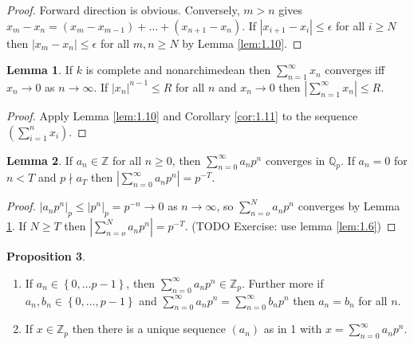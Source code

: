 \documentclass{article}
\newcommand{\Z}{\mathbb{Z}}
\newcommand{\Q}{\mathbb{Q}}
\newcommand{\rb}[1]{\left( #1 \right)}
\newcommand{\cb}[1]{\left\{ #1 \right\}}
\newcommand{\abs}[1]{\left\lvert #1 \right\rvert}
\theoremstyle{definition}\newtheorem{definition}{Definition}[section]
\theoremstyle{definition}\newtheorem{remark}[definition]{Remark}
\theoremstyle{definition}\newtheorem*{example}{Example}
\theoremstyle{definition}\newtheorem*{note}{Note}
\newtheorem{proposition}[definition]{Proposition}
\newtheorem{lemma}[definition]{Lemma}
\begin{document}
\begin{proof}
Forward direction is obvious. Conversely, $ m > n $ gives $ x_m - x_n = \rb{x_m - x_{m - 1}} + \dots + \rb{x_{n + 1} - x_n} $. If $ \abs{x_{i + 1} - x_i} \le \epsilon $ for all $ i \ge N $ then $ \abs{x_m - x_n} \le \epsilon $ for all $ m, n \ge N $ by Lemma \ref{lem:1.10}.
\end{proof}

\begin{lemma}
\label{lem:1.12}
If $ k $ is complete and nonarchimedean then $ \sum_{n = 1}^\infty x_n $ converges iff $ x_n \to 0 $ as $ n \to \infty $. If $ \abs{x_n}^{n - 1} \le R $ for all $ n $ and $ x_n \to 0 $ then $ \abs{\sum_{n = 1}^\infty x_n} \le R $.
\end{lemma}

\begin{proof}
Apply Lemma \ref{lem:1.10} and Corollary \ref{cor:1.11} to the sequence $ \rb{\sum_{i = 1}^n x_i} $.
\end{proof}

\begin{lemma}
\label{lem:1.13}
If $ a_n \in \Z $ for all $ n \ge 0 $, then $ \sum_{n = 0}^\infty a_np^n $ converges in $ \Q_p $. If $ a_n = 0 $ for $ n < T $ and $ p \nmid a_T $ then $ \abs{\sum_{n = 0}^\infty a_np^n} = p^{-T} $.
\end{lemma}

\begin{proof}
$ \abs{a_np^n}_p \le \abs{p^n}_p = p^{-n} \to 0 $ as $ n \to \infty $, so $ \sum_{n = o}^N a_np^n $ converges by Lemma \ref{lem:1.12}. If $ N \ge T $ then $ \abs{\sum_{n = o}^N a_np^n} = p^{-T} $. (TODO Exercise: use lemma \ref{lem:1.6})
\end{proof}

\begin{proposition}
\label{prop:1.14}
\hfill
\begin{enumerate}
\item If $ a_n \in \cb{0, \dots p - 1} $, then $ \sum_{n = 0}^\infty a_np^n \in \Z_p $. Further more if $ a_n, b_n \in \cb{0, \dots, p - 1} $ and $ \sum_{n = 0}^\infty a_np^n = \sum_{n = 0}^\infty b_np^n $ then $ a_n = b_n $ for all $ n $.
\item If $ x \in \Z_p $ then there is a unique sequence $ \rb{a_n} $ as in 1 with $ x = \sum_{n = 0}^\infty a_np^n $.
\end{enumerate}
\end{proposition}
\end{document}
